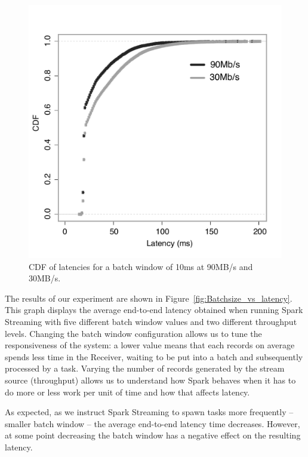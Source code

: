\begin{figure}[t!]
  \begin{center}
    \includegraphics[scale=0.48]{images_graphs/cdf_latencies/cdf_e2e_times_illus.pdf}
  \end{center}
  \caption{CDF of latencies for a batch window of 10ms at 90MB/s and 30MB/s.}
  \label{fig:CDF_latencies}
\end{figure}

The results of our experiment are shown in Figure~\ref{fig:Batchsize_vs_latency}.
This graph displays the average end-to-end latency obtained when running Spark Streaming with five different batch window values and two different throughput levels.
Changing the batch window configuration allows us to tune the responsiveness of the system: a lower value means that each records on average spends less time in the Receiver, waiting to be put into a batch and subsequently processed by a task.
Varying the number of records generated by the stream source (throughput) allows us to understand how Spark behaves when it has to do more or less work per unit of time and how that affects latency.

As expected, as we instruct Spark Streaming to spawn tasks more frequently -- smaller batch window -- the average end-to-end latency time decreases.
However, at some point decreasing the batch window has a negative effect on the resulting latency.

